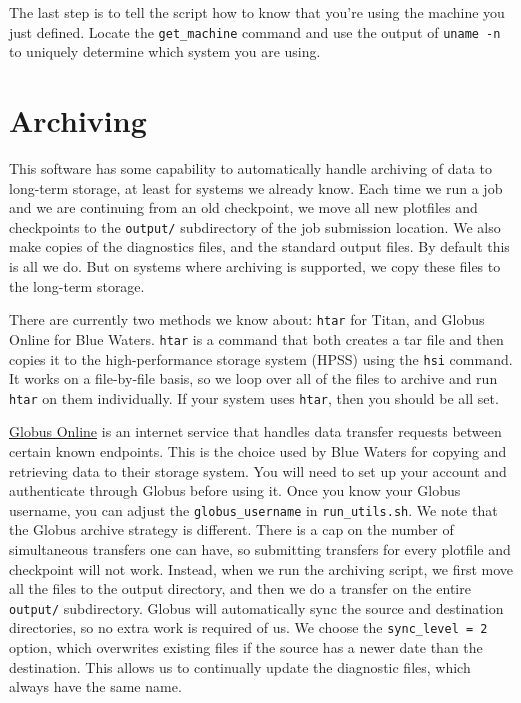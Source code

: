 \documentclass[12pt]{book}
\begin{document}
The last step is to tell the script how to know that you're using the machine you just defined. 
Locate the \texttt{get\_machine} command and use the output of \texttt{uname -n} to uniquely determine 
which system you are using.

\section{Archiving}
\label{sec:archiving}

This software has some capability to automatically handle archiving of data to long-term storage,
at least for systems we already know. Each time we run a job and we are continuing from an old checkpoint,
we move all new plotfiles and checkpoints to the \texttt{output/} subdirectory of the job submission 
location. We also make copies of the diagnostics files, and the standard output files. By default this is 
all we do. But on systems where archiving is supported, we copy these files to the long-term storage.

There are currently two methods we know about: \texttt{htar} for Titan, and Globus Online for Blue Waters.
\texttt{htar} is a command that both creates a tar file and then copies it to the high-performance storage system 
(HPSS) using the \texttt{hsi} command. It works on a file-by-file basis, so we loop over all of the files to 
archive and run \texttt{htar} on them individually. If your system uses \texttt{htar}, then you should be all set.

\href{https://www.globus.org/}{Globus Online} is an internet service that handles data transfer requests 
between certain known endpoints. This is the choice used by Blue Waters for copying and retrieving data
to their storage system. You will need to set up your account and authenticate through Globus before using it.
Once you know your Globus username, you can adjust the \texttt{globus\_username} in \texttt{run\_utils.sh}. 
We note that the Globus archive strategy is different. There is a cap on the number of simultaneous transfers 
one can have, so submitting transfers for every plotfile and checkpoint will not work. Instead, when we 
run the archiving script, we first move all the files to the output directory, and then we do a transfer 
on the entire \texttt{output/} subdirectory. Globus will automatically sync the source and destination 
directories, so no extra work is required of us. We choose the \texttt{sync\_level = 2} option, which 
overwrites existing files if the source has a newer date than the destination. This allows us to 
continually update the diagnostic files, which always have the same name.
\end{document}
